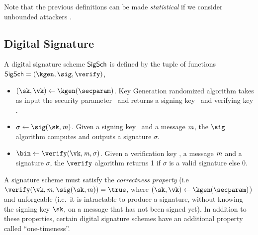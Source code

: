 Note that the previous definitions can be made \emph{statistical} if we consider unbounded attackers \adv.

\subsection{Digital Signature}\label{preliminaries:definitions:digital-signature}

\begin{definition}
    A digital signature scheme $\mathsf{SigSch}$ is defined by the tuple of functions $\sigscheme = (\kgen, \sig, \verify)$,
    \begin{itemize}
        \item $(\sk, \vk) \gets \kgen(\secparam)$. Key Generation randomized algorithm takes as input the security parameter \secparam~and returns a signing key \sk~and verifying key \vk.
        \item $\sigma \gets \sig(\sk, \msg)$. Given a signing key \sk~and a message $\mathit{m}$, the $\sig$ algorithm computes and outputs a signature $\sigma$.
        \item $\bin \gets \verify(\vk, \msg, \sigma)$. Given a verification key \vk, a message $\mathit{m}$ and a signature $\sigma$, the $\verify$ algorithm returns 1 if $\sigma$ is a valid signature else 0.
    \end{itemize}
\end{definition}

A signature scheme must satisfy the \emph{correctness property} (i.e~$\verify(\vk, \msg, \sig(\sk, \msg)) = \true$, where $(\sk, \vk) \gets \kgen(\secparam)$) and unforgeable (i.e.~it is intractable to produce a signature, without knowing the signing key $\sk$, on a message that has not been signed yet). In addition to these properties, certain digital signature schemes have an additional property called ``one-timeness''.

